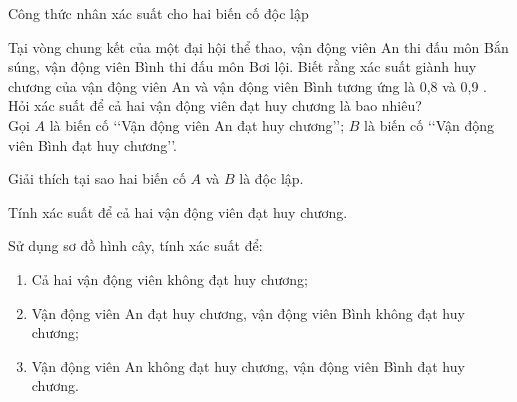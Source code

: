 \begin{dang}{Công thức nhân xác suất cho hai biến cố độc lập}
\end{dang}
\begin{vd}%
	Tại vòng chung kết của một đại hội thể thao, vận động viên An thi đấu môn Bắn súng, vận động viên Bình thi đấu môn Bơi lội.
	Biết rằng xác suất giành huy chương của vận động viên An và vận động viên Bình tương ứng là 0,8 và 0,9 . Hỏi xác suất để cả hai vận động viên đạt huy chương là bao nhiêu?
	\\Gọi $A$ là biến cố \lq\lq  Vận động viên An đạt huy chương\rq\rq; $B$ là biến cố \lq\lq  Vận động viên Bình đạt huy chương\rq\rq.
	\begin{enumEX}{1}
	\item Giải thích tại sao hai biến cố $A$ và $B$ là độc lập.
	\item Tính xác suất để cả hai vận động viên đạt huy chương.
	\item Sử dụng sơ đồ hình cây, tính xác suất để:
	\begin{enumerate}[--]
	\item Cả hai vận động viên không đạt huy chương;
	\item Vận động viên An đạt huy chương, vận động viên Bình không đạt huy chương;
	\item Vận động viên An không đạt huy chương, vận động viên Bình đạt huy chương.
	\end{enumerate}
	\end{enumEX}
\end{vd}
